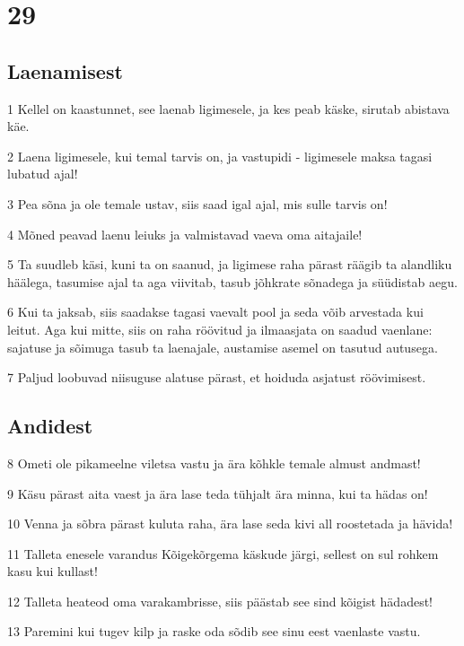 \chapter{29}

\section*{Laenamisest}

\par 1 Kellel on kaastunnet, see laenab ligimesele, ja kes peab käske, sirutab abistava käe.
\par 2 Laena ligimesele, kui temal tarvis on, ja vastupidi - ligimesele maksa tagasi lubatud ajal!
\par 3 Pea sõna ja ole temale ustav, siis saad igal ajal, mis sulle tarvis on!
\par 4 Mõned peavad laenu leiuks ja valmistavad vaeva oma aitajaile!
\par 5 Ta suudleb käsi, kuni ta on saanud, ja ligimese raha pärast räägib ta alandliku häälega, tasumise ajal ta aga viivitab, tasub jõhkrate sõnadega ja süüdistab aegu.
\par 6 Kui ta jaksab, siis saadakse tagasi vaevalt pool ja seda võib arvestada kui leitut. Aga kui mitte, siis on raha röövitud ja ilmaasjata on saadud vaenlane: sajatuse ja sõimuga tasub ta laenajale, austamise asemel on tasutud autusega.
\par 7 Paljud loobuvad niisuguse alatuse pärast, et hoiduda asjatust röövimisest.

\section*{Andidest}

\par 8 Ometi ole pikameelne viletsa vastu ja ära kõhkle temale almust andmast!
\par 9 Käsu pärast aita vaest ja ära lase teda tühjalt ära minna, kui ta hädas on!
\par 10 Venna ja sõbra pärast kuluta raha, ära lase seda kivi all roostetada ja hävida!
\par 11 Talleta enesele varandus Kõigekõrgema käskude järgi, sellest on sul rohkem kasu kui kullast!
\par 12 Talleta heateod oma varakambrisse, siis päästab see sind kõigist hädadest!
\par 13 Paremini kui tugev kilp ja raske oda sõdib see sinu eest vaenlaste vastu.

